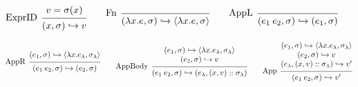 \documentclass[acmsmall,screen,review]{acmart}\settopmatter{printfolios=true,printccs=false,printacmref=false}
\theoremstyle{acmdefinition}
\newcommand*{\cons}{::}
\newcommand*{\ctx}{\sigma}
\newcommand*{\semarrow}{\hookrightarrow}
\begin{document}
\begin{figure}[t!]
  \scriptsize
  \begin{flushright}
    \fbox{$(e,\ctx)\semarrow V\text{ or }(e',\ctx')$}
  \end{flushright}
  \centering
  \vspace{0pt} %
  \[
    \begin{prooftree}
      \hypo{v=\ctx(x)}
      \infer[left label=ExprID]1{
      (x, \ctx)
      \semarrow
      v
      }
    \end{prooftree}\qquad
    \begin{prooftree}
      \infer[left label=Fn]0{
      (\lambda x.e, \ctx)
      \semarrow
      \langle\lambda x.e, \ctx\rangle
      }
    \end{prooftree}\qquad
    \begin{prooftree}
      \infer[left label={AppL}]0{
      (e_{1}\:e_{2}, \ctx)
      \semarrow
      (e_{1},\ctx)
      }
    \end{prooftree}
  \]

  \[
    \begin{prooftree}
      \hypo{
        \begin{matrix}
          (e_{1}, \ctx)
          \semarrow
          \langle\lambda x.e_{\lambda}, \ctx_{\lambda}\rangle
        \end{matrix}
      }
      \infer[left label={AppR}]1{
      (e_{1}\:e_{2}, \ctx)
      \semarrow
      (e_{2}, \ctx)
      }
    \end{prooftree}\qquad
    \begin{prooftree}
      \hypo{
        \begin{matrix}
          (e_{1}, \ctx)
          \semarrow
          \langle\lambda x.e_{\lambda}, \ctx_{\lambda}\rangle \\
          (e_{2}, \ctx)
          \semarrow
          v
        \end{matrix}
      }
      \infer[left label={AppBody}]1{
      (e_{1}\:e_{2}, \ctx)
      \semarrow
      (e_{\lambda}, (x, v)\cons \ctx_{\lambda})
      }
    \end{prooftree}\qquad
    \begin{prooftree}
      \hypo{
        \begin{matrix}
          (e_{1}, \ctx)
          \semarrow
          \langle\lambda x.e_{\lambda}, \ctx_{\lambda}\rangle \\
          (e_{2}, \ctx)
          \semarrow
          v                                                   \\
          (e_{\lambda}, (x, v)\cons \ctx_{\lambda})
          \semarrow
          v'
        \end{matrix}
      }
      \infer[left label={App}]1{
      (e_{1}\:e_{2}, \ctx)
      \semarrow
      v'
      }
    \end{prooftree}
  \]


\end{figure}
\end{document}

